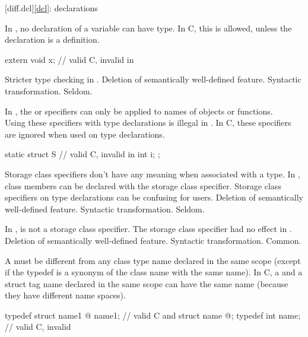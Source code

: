 [diff.dcl]{\ref*{dcl}: declarations}

\change
In \Cpp{}, no declaration of a variable can have \cv{}  type.
In C, this is allowed, unless the declaration is a definition.
\begin{example}
\begin{codeblock}
extern void x;  // valid C, invalid in \Cpp{}
\end{codeblock}
\end{example}
\rationale
Stricter type checking in \Cpp{}.
\effect
Deletion of semantically well-defined feature.
\difficulty
Syntactic transformation.
\howwide
Seldom.

\change
In \Cpp{}, the  or  specifiers can only be applied to names of objects or functions.\\
Using these specifiers with type declarations is illegal in \Cpp{}.
In C, these specifiers are ignored when used on type declarations.

\begin{example}
\begin{codeblock}
static struct S {               // valid C, invalid in \Cpp{}
  int i;
};
\end{codeblock}
\end{example}

\rationale
Storage class specifiers don't have any meaning when associated
with a type.
In \Cpp{}, class members can be declared with the  storage
class specifier.
Storage class specifiers on type
declarations can be confusing for users.
\effect
Deletion of semantically well-defined feature.
\difficulty
Syntactic transformation.
\howwide
Seldom.

\change
In \Cpp{},  is not a storage class specifier.
\rationale
The storage class specifier had no effect in \Cpp{}.
\effect
Deletion of semantically well-defined feature.
\difficulty
Syntactic transformation.
\howwide
Common.

\change
A \Cpp{}  must be different from any class type name declared
in the same scope (except if the typedef is a synonym of the class name with the
same name). In C, a  and a struct tag name declared in the same scope
can have the same name (because they have different name spaces).

\begin{example}
\begin{codeblock}
typedef struct name1 { @\commentellip@ } name1;         // valid C and \Cpp{}
struct name { @\commentellip@ };
typedef int name;               // valid C, invalid \Cpp{}
\end{codeblock}
\end{example}

